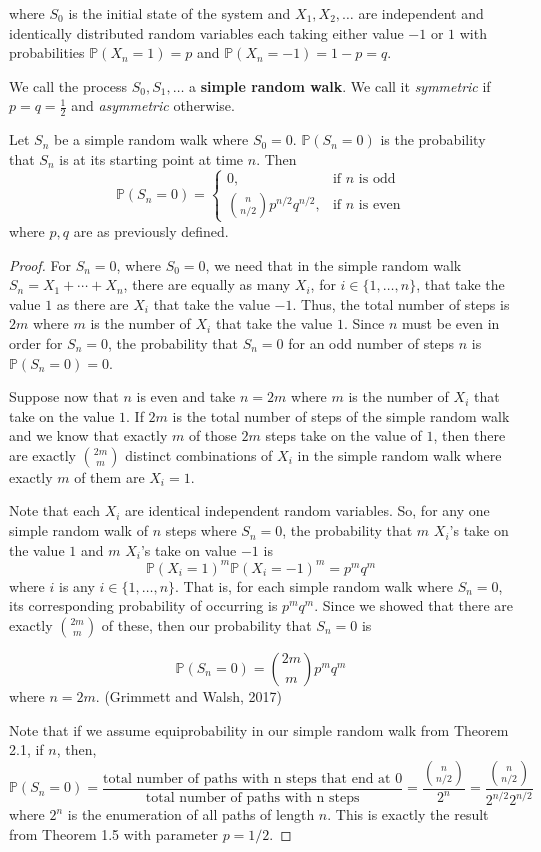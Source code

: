 \documentclass[12pt]{article}
\theoremstyle{definition}
\numberwithin{equation}{section}
\newcommand{\Pro}{\ensuremath{\mathbb{P}}}
\begin{document}
where $S_0$ is the initial state of the system and $X_1,X_2,\ldots$ are independent and identically distributed random variables each taking either value $-1$ or $1$ with probabilities $\Pro(X_n=1)=p$ and $\Pro(X_n = -1) = 1-p=q$.

 We call the process $S_0,S_1,\ldots$ a \textbf{simple random walk}. We call it \emph{symmetric} if $p = q = \frac{1}{2}$ and \emph{asymmetric} otherwise.

\theorem Let $S_n$ be a simple random walk where $S_0=0$. $\Pro(S_n=0)$ is the probability that $S_n$ is at its starting point at time $n$. Then 
\begin{equation}
\Pro(S_n = 0) = \begin{cases}
    0, & \text{if } n \text{ is odd}\\
    \binom{n}{n/2}p^{n/2}q^{n/2}, & \text{if } n \text{ is even}
\end{cases}
\end{equation}
where $p,q$ are as previously defined.
\begin{proof}
For $S_n = 0$, where $S_0=0$, we need that in the simple random walk $S_n = X_1+\cdots +X_n$, there are equally as many $X_i$, for $i\in \{1,\ldots,n\}$, that take the value $1$ as there are $X_i$ that take the value $-1$. Thus, the total number of steps is $2m$ where $m$ is the number of $X_i$ that take the value $1$. Since $n$ must be even in order for $S_n=0$, the probability that $S_n=0$ for an odd number of steps $n$ is $\Pro(S_n = 0)=0$.\smallskip

Suppose now that $n$ is even and take $n=2m$ where $m$ is the number of $X_i$ that take on the value $1$. If $2m$ is the total number of steps of the simple random walk and we know that exactly $m$ of those $2m$ steps take on the value of $1$, then there are exactly $\binom{2m}{m}$ distinct combinations of $X_i$ in the simple random walk where exactly $m$ of them are $X_i = 1$.\smallskip

Note that each $X_i$ are identical independent random variables. So, for any one simple random walk of $n$ steps where $S_n=0$, the probability that $m$ $X_i$'s take on the value $1$ and $m$ $X_i$'s take on value $-1$ is
$$\Pro(X_i = 1)^m\Pro(X_i = -1)^m = p^mq^m$$
where $i$ is any $i\in\{1,\ldots, n\}$.
That is, for each simple random walk where $S_n=0$, its corresponding probability of occurring is $p^mq^m$. Since we showed that there are exactly $\binom{2m}{m}$ of these, then our probability that $S_n = 0$ is

$$\Pro(S_n = 0) = \binom{2m}{m}p^mq^m$$
where $n=2m$. (Grimmett and Walsh, 2017)

Note that if we assume equiprobability  in our simple random walk from Theorem 2.1, if $n$, then, $$\Pro(S_n = 0) = \frac{\text{total number of paths with n steps that end at 0}}{\text{total number of paths with n steps}} = \frac{\binom{n}{n/2}}{2^{n}} = \frac{\binom{n}{n/2}}{2^{n/2}2^{n/2}}$$
where $2^{n}$ is the enumeration of all paths of length $n$. This is exactly the result from Theorem 1.5 with parameter $p=1/2$.
\end{proof}
\end{document}
